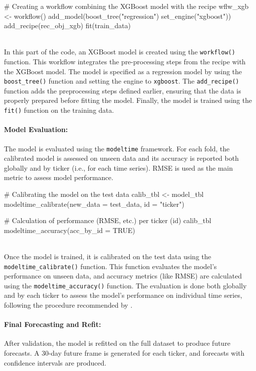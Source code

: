 \documentclass[12pt]{report}
\begin{document}
\begin{code}
# Creating a workflow combining the XGBoost model with the recipe
wflw_xgb <- workflow() %
  add_model(boost_tree("regression") %
  set_engine("xgboost")) %
  add_recipe(rec_obj_xgb) %
  fit(train_data) 
\end{code}\\

In this part of the code, an XGBoost model is created using the \texttt{workflow()} function. This workflow integrates the pre-processing steps from the recipe with the XGBoost model. The model is specified as a regression model by using the \texttt{boost\_tree()} function and setting the engine to \texttt{xgboost}. The \texttt{add\_recipe()} function adds the preprocessing steps defined earlier, ensuring that the data is properly prepared before fitting the model. Finally, the model is trained using the \texttt{fit()} function on the training data.

\paragraph{Model Evaluation:}
The model is evaluated using the \texttt{modeltime} framework. For each fold, the calibrated model is assessed on unseen data and its accuracy is reported both globally and by ticker (i.e., for each time series). RMSE is used as the main metric to assess model performance.\\

\begin{code}
# Calibrating the model on the test data
calib_tbl <- model_tbl %
  modeltime_calibrate(new_data = test_data, id = "ticker") 

# Calculation of performance (RMSE, etc.) per ticker (id)
calib_tbl %
  modeltime_accuracy(acc_by_id = TRUE)  
\end{code}\\

Once the model is trained, it is calibrated on the test data using the \texttt{modeltime\_calibrate()} function. This function evaluates the model's performance on unseen data, and accuracy metrics (like RMSE) are calculated using the \texttt{modeltime\_accuracy()} function. The evaluation is done both globally and by each ticker to assess the model's performance on individual time series, following the procedure recommended by \cite{modeltime_panel_data}.


\paragraph{Final Forecasting and Refit:}
After validation, the model is refitted on the full dataset to produce future forecasts. A 30-day future frame is generated for each ticker, and forecasts with confidence intervals are produced.\\
\end{document}
